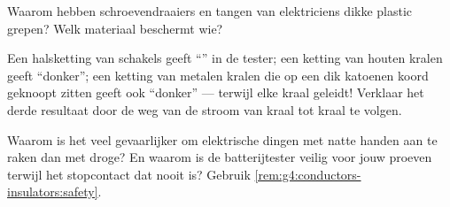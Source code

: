 \begin{exercise}[$\star$]\label{exo:g4:conductors-insulators:9}
Waarom hebben schroevendraaiers en tangen van elektriciens dikke
plastic grepen? Welk materiaal beschermt wie?
\end{exercise}

\begin{exercise}[$\star\star$]\label{exo:g4:conductors-insulators:10}
Een halsketting van schakels geeft ``'' in de tester; een ketting
van houten kralen geeft ``donker''; een ketting van metalen kralen die
op een dik katoenen koord geknoopt zitten geeft ook ``donker'' ---
terwijl elke kraal geleidt! Verklaar het derde resultaat door de weg
van de stroom van kraal tot kraal te volgen.
\end{exercise}

\begin{exercise}[$\star\star$]\label{exo:g4:conductors-insulators:11}
Waarom is het veel gevaarlijker om elektrische dingen met natte handen
aan te raken dan met droge? En waarom is de batterijtester veilig voor
jouw proeven terwijl het stopcontact dat nooit is? Gebruik
\cref{rem:g4:conductors-insulators:safety}.
\end{exercise}
